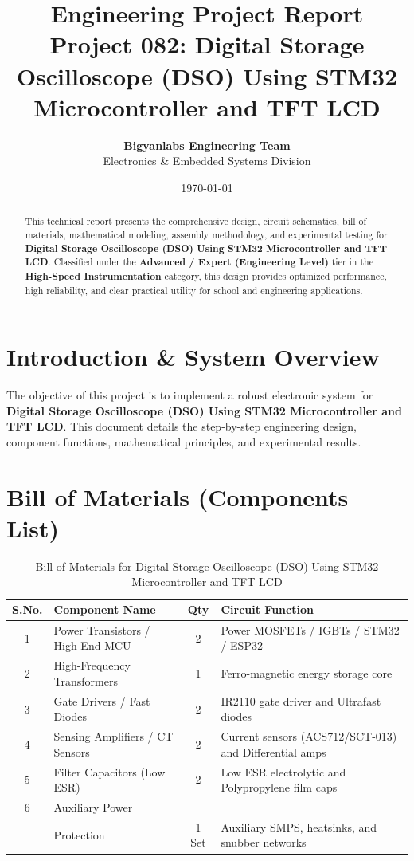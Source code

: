 \documentclass[11pt,a4paper]{article}
\title{\textbf{\Huge Engineering Project Report}\\[0.5em] \Large Project 082: Digital Storage Oscilloscope (DSO) Using STM32 Microcontroller and TFT LCD}
\author{\textbf{Bigyanlabs Engineering Team}\\ Electronics \& Embedded Systems Division}
\date{\today}
\begin{document}
\maketitle
\thispagestyle{empty}

\begin{abstract}
This technical report presents the comprehensive design, circuit schematics, bill of materials, mathematical modeling, assembly methodology, and experimental testing for \textbf{Digital Storage Oscilloscope (DSO) Using STM32 Microcontroller and TFT LCD}. Classified under the \textbf{Advanced / Expert (Engineering Level)} tier in the \textbf{High-Speed Instrumentation} category, this design provides optimized performance, high reliability, and clear practical utility for school and engineering applications.
\end{abstract}

\newpage
\tableofcontents
\newpage

\section{Introduction \& System Overview}
The objective of this project is to implement a robust electronic system for \textbf{Digital Storage Oscilloscope (DSO) Using STM32 Microcontroller and TFT LCD}. This document details the step-by-step engineering design, component functions, mathematical principles, and experimental results.

\section{Bill of Materials (Components List)}
\begin{table}[h!]
\centering
\caption{Bill of Materials for Digital Storage Oscilloscope (DSO) Using STM32 Microcontroller and TFT LCD}
\vspace{0.5em}
\begin{tabular}{clcp{7cm}}
\toprule
\textbf{S.No.} & \textbf{Component Name} & \textbf{Qty} & \textbf{Circuit Function} \\
\midrule
1 & Power Transistors / High-End MCU & 2 & Power MOSFETs / IGBTs / STM32 / ESP32 \\
2 & High-Frequency Transformers & 1 & Ferro-magnetic energy storage core \\
3 & Gate Drivers / Fast Diodes & 2 & IR2110 gate driver and Ultrafast diodes \\
4 & Sensing Amplifiers / CT Sensors & 2 & Current sensors (ACS712/SCT-013) and Differential amps \\
5 & Filter Capacitors (Low ESR) & 2 & Low ESR electrolytic and Polypropylene film caps \\
6 & Auxiliary Power \\& Protection & 1 Set & Auxiliary SMPS, heatsinks, and snubber networks \\
\bottomrule
\end{tabular}
\end{table}
\end{document}
